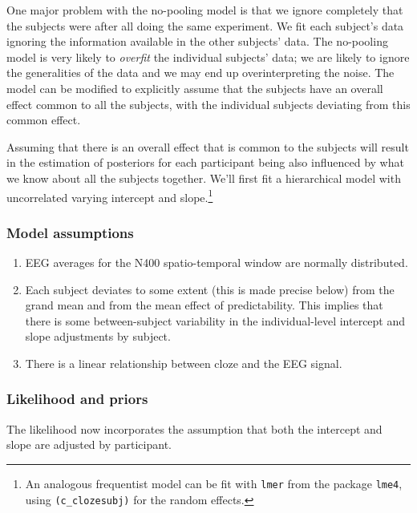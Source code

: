 \documentclass[12pt,]{krantz}
\providecommand{\tightlist}{%
  \setlength{\itemsep}{0pt}\setlength{\parskip}{0pt}}
\theoremstyle{definition}
\theoremstyle{definition}
\theoremstyle{definition}
\theoremstyle{remark}
\begin{document}
One major problem with the no-pooling model is that we ignore completely that the subjects were after all doing the same experiment. We fit each subject's data ignoring the information available in the other subjects' data.
The no-pooling model is very likely to \emph{overfit} the individual subjects' data; we are likely to ignore the generalities of the data and we may end up overinterpreting the noise. The model can be modified to explicitly assume that the subjects have an overall effect common to all the subjects, with the individual subjects deviating from this common effect.

Assuming that there is an overall effect that is common to the subjects will result in the estimation of posteriors for each participant being also influenced by what we know about all the subjects together. We'll first fit a hierarchical model with uncorrelated varying intercept and slope.\footnote{An analogous frequentist model can be fit with \texttt{lmer} from the package \texttt{lme4}, using \texttt{(c\_cloze\textbar{}\textbar{}subj)} for the random effects.}

\hypertarget{model-assumptions-2}{%
\subsubsection{Model assumptions}\label{model-assumptions-2}}

\begin{enumerate}
\def\labelenumi{\arabic{enumi}.}
\tightlist
\item
  EEG averages for the N400 spatio-temporal window are normally distributed.
\item
  Each subject deviates to some extent (this is made precise below) from the grand mean and from the mean effect of predictability. This implies that there is some between-subject variability in the individual-level intercept and slope adjustments by subject.
\item
  There is a linear relationship between cloze and the EEG signal.
\end{enumerate}

\hypertarget{likelihood-and-priors-3}{%
\subsubsection{Likelihood and priors}\label{likelihood-and-priors-3}}

The likelihood now incorporates the assumption that both the intercept and slope are adjusted by participant.
\end{document}
